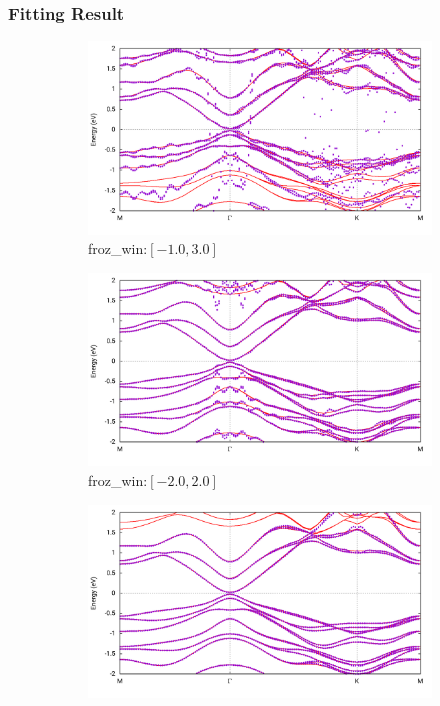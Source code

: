\documentclass{beamer}
\begin{document}
  \begin{frame}
    \frametitle{Fitting Result}
    \begin{figure}
      \centering
      \begin{subfigure}{0.42\textwidth}
         \centering
         \includegraphics[width=\textwidth]{figure/Band_-1-0_to_3-0.png}\caption{{\small froz\_win:\([-1.0,3.0]\)}}
      \end{subfigure}
      \begin{subfigure}{0.42\textwidth}
         \centering
         \includegraphics[width=\textwidth]{figure/Band_-2-0_to_2-0.png}
         \caption{{\small froz\_win:\([-2.0,2.0]\)}}
      \end{subfigure}
      \begin{subfigure}{0.42\textwidth}
         \centering
         \includegraphics[width=\textwidth]{figure/Band_-1-5_to_1-5.png}

\end{subfigure}
\end{figure}
\end{frame}
\end{document}
